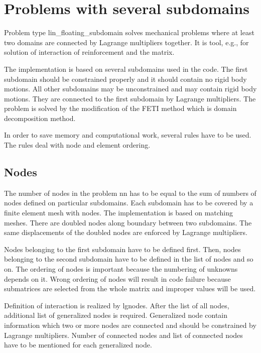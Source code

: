 \section{Problems with several subdomains}

Problem type lin\_floating\_subdomain solves mechanical problems where at least two domains
are connected by Lagrange multipliers together. It is tool, e.g., for solution of interaction
of reinforcement and the matrix.

The implementation is based on several subdomains used in the code. The first subdomain
should be constrained properly and it should contain no rigid body motions. All other
subdomains may be unconstrained and may contain rigid body motions. They are connected
to the first subdomain by Lagrange multipliers. The problem is solved by the modification
of the FETI method which is domain decomposition method.


In order to save memory and computational work, several rules have to be used. The rules deal
with node and element ordering.


\subsection{Nodes}

The number of nodes in the problem nn has to be equal to the sum of numbers of nodes defined
on particular subdomains. Each subdomain has to be covered by a finite element mesh with nodes.
The implementation is based on matching meshes. There are doubled nodes along boundary
between two subdomains. The same displacements of the doubled nodes are enforced by Lagrange
multipliers.

Nodes belonging to the first subdomain have to be defined first. Then, nodes belonging to the second
subdomain have to be defined in the list of nodes and so on. The ordering of nodes is important
because the numbering of unknowns depends on it. Wrong ordering of nodes will result in code
failure because submatrices are selected from the whole matrix and improper values will be used.

Definition of interaction is realized by lgnodes. After the list of all nodes, additional
list of generalized nodes is required. Generalized node contain information which two or
more nodes are connected and should be constrained by Lagrange multipliers. Number of connected
nodes and list of connected nodes have to be mentioned for each generalized node.

